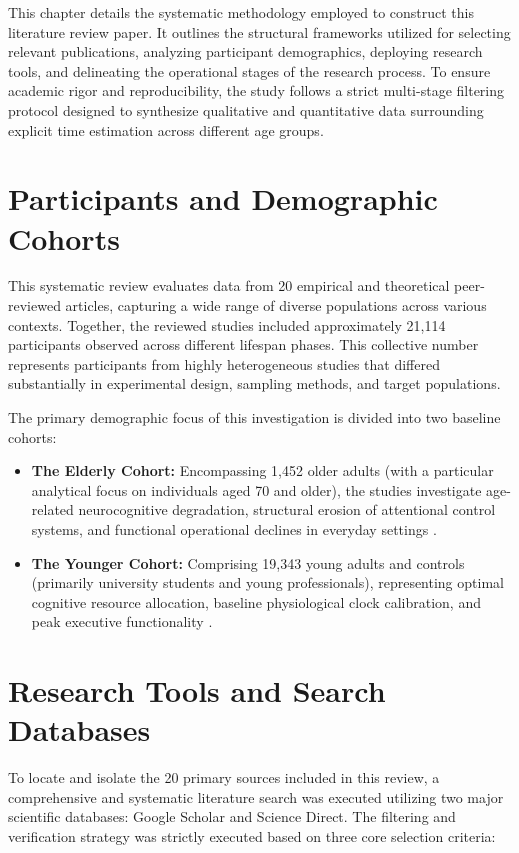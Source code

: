 \documentclass{custom_report}
\begin{document}
This chapter details the systematic methodology employed to construct this literature review paper. It outlines the structural frameworks utilized for selecting relevant publications, analyzing participant demographics, deploying research tools, and delineating the operational stages of the research process. To ensure academic rigor and reproducibility, the study follows a strict multi-stage filtering protocol designed to synthesize qualitative and quantitative data surrounding explicit time estimation across different age groups.

\section{Participants and Demographic Cohorts}
This systematic review evaluates data from 20 empirical and theoretical peer-reviewed articles, capturing a wide range of diverse populations across various contexts. Together, the reviewed studies included approximately 21,114 participants observed across different lifespan phases. This collective number represents participants from highly heterogeneous studies that differed substantially in experimental design, sampling methods, and target populations.

The primary demographic focus of this investigation is divided into two baseline cohorts:
\begin{itemize}
    \item \textbf{The Elderly Cohort:} Encompassing 1,452 older adults (with a particular analytical focus on individuals aged 70 and older), the studies investigate age-related neurocognitive degradation, structural erosion of attentional control systems, and functional operational declines in everyday settings \cite{Carrigan2026, Zivotofsky2012}.
    \item \textbf{The Younger Cohort:} Comprising 19,343 young adults and controls (primarily university students and young professionals), representing optimal cognitive resource allocation, baseline physiological clock calibration, and peak executive functionality \cite{Baudouin2019, Craik1999}.
\end{itemize}

\section{Research Tools and Search Databases}
To locate and isolate the 20 primary sources included in this review, a comprehensive and systematic literature search was executed utilizing two major scientific databases: Google Scholar and Science Direct. The filtering and verification strategy was strictly executed based on three core selection criteria:
\end{document}

